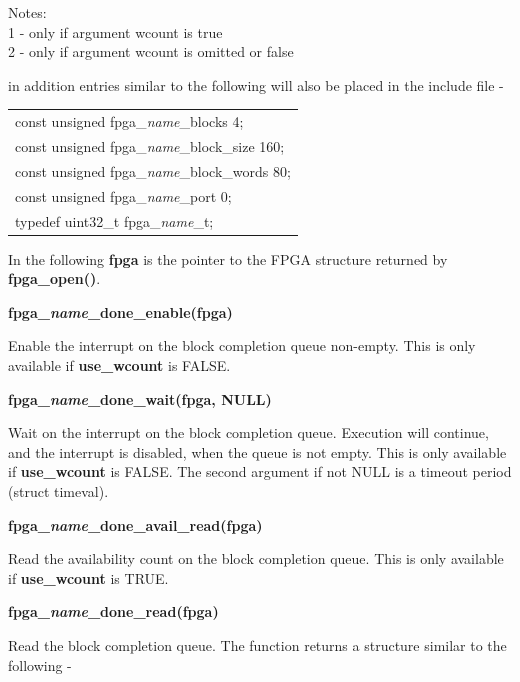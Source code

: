             Notes:\\
            1 - only if argument wcount is true\\
            2 - only if argument wcount is omitted or false
            
            in addition entries similar to the following will also be placed
            in the include file -
            
            \begin{tabular}{| l |}
            \hline
            const unsigned fpga\_{\em name}\_blocks 4; \\
            const unsigned fpga\_{\em name}\_block\_size 160; \\
            const unsigned fpga\_{\em name}\_block\_words 80; \\
            const unsigned fpga\_{\em name}\_port 0; \\
            typedef uint32\_t fpga\_{\em name}\_t; \\
            \hline
            \end{tabular}

            In the following {\bf fpga} is the pointer to the FPGA
            structure returned by {\bf fpga\_open()}.
            
            {\bf fpga\_{\em name}\_done\_enable(fpga)}
            
            Enable the interrupt on the block completion queue non-empty. This is
            only available if {\bf use\_wcount} is FALSE.
            
            {\bf fpga\_{\em name}\_done\_wait(fpga, NULL)}
            
            Wait on the interrupt on the block completion queue. Execution will
            continue, and the interrupt is disabled, when the queue is not empty.
            This is only available if {\bf use\_wcount} is FALSE. The second
            argument if not NULL is a timeout period (struct timeval).
            
            {\bf fpga\_{\em name}\_done\_avail\_read(fpga)}
            
            Read the availability count on the block completion queue. This is
            only available if {\bf use\_wcount} is TRUE.
            
            {\bf fpga\_{\em name}\_done\_read(fpga)}
            
            Read the block completion queue. The function returns a structure
            similar to the following -
            
